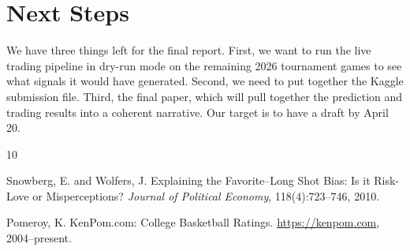 \documentclass[11pt,a4paper]{article}
\begin{document}
\section{Next Steps}

We have three things left for the final report. First, we want to run the live trading pipeline in dry-run mode on the remaining 2026 tournament games to see what signals it would have generated. Second, we need to put together the Kaggle submission file. Third, the final paper, which will pull together the prediction and trading results into a coherent narrative. Our target is to have a draft by April 20.




\begin{thebibliography}{10}

Snowberg, E. and Wolfers, J.
\newblock Explaining the Favorite--Long Shot Bias: Is it Risk-Love or Misperceptions?
\newblock \emph{Journal of Political Economy}, 118(4):723--746, 2010.

Pomeroy, K.
\newblock KenPom.com: College Basketball Ratings.
\newblock \url{https://kenpom.com}, 2004--present.

\end{thebibliography}
\end{document}
